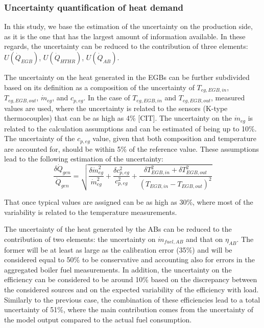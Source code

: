 \documentclass[preprint,12pt]{elsarticle}
\begin{document}
\subsubsection{Uncertainty quantification of heat demand}

In this study, we base the estimation of the uncertainty on the production side, as it is the one that has the largest amount of information available. In these regards, the uncertainty can be reduced to the contribution of three elements: $U(\dot{Q}_{EGB})$, $U(\dot{Q}_{HTHR})$, $U(\dot{Q}_{AB})$.

The uncertainty on the heat generated in the EGBs can be further subdivided based on its definition as a composition of the uncertainty of $T_{eg,EGB,in}$, $T_{eg,EGB,out}$, $\dot{m}_{eg}$, and $c_{p,eg}$. In the case of $T_{eg,EGB,in}$ and $T_{eg,EGB,out}$, measured values are used, where the uncertainty is related to the sensors (K-type thermocouples) that can be as high as 4\% [CIT]. The uncertainty on the $\dot{m}_{eg}$ is related to the calculation assumptions and can be estimated of being up to 10\%. The uncertainty of the $c_{p,eg}$ value, given that both composition and temperature are accounted for, should be within 5\% of the reference value. These assumptions lead to the following estimation of the uncertainty:
\begin{equation}
\frac{\delta \dot{Q}_{gen}}{\dot{Q}_{gen}} = \sqrt{\frac{\delta \dot{m}_{eg}^2}{\dot{m}_{eg}^2} + \frac{\delta c_{p,eg}^2}{c_{p,eg}^2} + \frac{\delta T_{EGB,in}^2 + \delta T_{EGB,out}^2}{(T_{EGB,in} - T_{EGB,out})^2}}
\end{equation}

That once typical values are assigned can be as high as 30\%, where most of the variability is related to the temperature measurements.

The uncertainty of the heat generated by the ABs can be reduced to the contribution of two elements: the uncertainty on $\dot{m}_{fuel,AB}$ and that on $\eta_{AB}$. The former will be at least as large as the calibration error (35\%) and will be considered equal to 50\% to be conservative and accounting also for errors in the aggregated boiler fuel measurements. In addition, the uncertainty on the efficiency can be considered to be around 10\% based on the discrepancy between the considered sources and on the expected variability of the efficiency with load. Similarly to the previous case, the combination of these efficiencies lead to a total uncertainty of 51\%, where the main contribution comes from the uncertainty of the model output compared to the actual fuel consumption.
\end{document}
